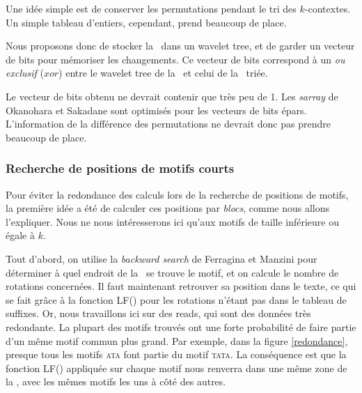 Une idée simple est de conserver les permutations pendant le tri des $k$-contextes. Un simple tableau d'entiers, cependant, prend beaucoup de place.

Nous proposons donc de stocker la \kbwt\ dans un wavelet tree, et de garder un vecteur de bits pour mémoriser les changements. Ce vecteur de bits correspond à un \textit{ou exclusif} ($xor$) entre le wavelet tree de la \kbwt\ et celui de la \kbwt\ triée.

Le vecteur de bits obtenu ne devrait contenir que très peu de 1. Les \textit{sarray} de Okanohara et Sakadane sont optimisés pour les vecteurs de bits épars. L'information de la différence des permutations ne devrait donc pas prendre beaucoup de place.


\subsubsection{Recherche de positions de motifs courts}
Pour éviter la redondance des calculs lors de la recherche de positions de motifs, la première idée a été de calculer ces positions par \textit{blocs}, comme nous allons l'expliquer. Nous ne nous intéresserons ici qu'aux motifs de taille inférieure ou égale à $k$. 

Tout d'abord, on utilise la \textit{backward search} de Ferragina et Manzini pour déterminer à quel endroit de la \kbwt\ se trouve le motif, et on calcule le nombre de rotations concernées. Il faut maintenant retrouver sa position dans le texte, ce qui se fait grâce à la fonction LF() pour les rotations n'étant pas dans le tableau de suffixes. Or, nous travaillons ici sur des reads, qui sont des données très redondante. La plupart des motifs trouvés ont une forte probabilité de faire partie d'un même motif commun plus grand. Par exemple, dans la figure \ref{redondance}, presque tous les motifs \textsc{ata} font partie du motif \textsc{tata}. La conséquence est que la fonction LF() appliquée sur chaque motif nous renverra dans une même zone de la \kbwt, avec les mêmes motifs les uns à côté des autres.

